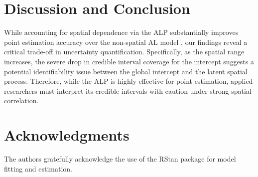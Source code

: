 \documentclass[twoside]{article}
\numberwithin{equation}{section}
\begin{document}
	\section*{Discussion and Conclusion}
	
	While accounting for spatial dependence via the ALP \cite{LumGelfand2012} substantially improves point estimation accuracy over the non-spatial AL model \cite{KozumiKobayashi2011}, our findings reveal a critical trade-off in uncertainty quantification. Specifically, as the spatial range increases, the severe drop in credible interval coverage for the intercept suggests a potential identifiability issue between the global intercept and the latent spatial process. Therefore, while the ALP is highly effective for point estimation, applied researchers must interpret its credible intervals with caution under strong spatial correlation.
	
	\section*{Acknowledgments}
	
	The authors gratefully acknowledge the use of the RStan package for model
	fitting and estimation.
	
\end{document}
